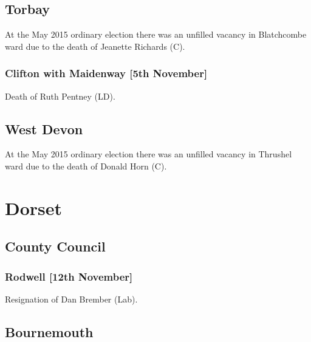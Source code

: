 \documentclass[a4paper,openany]{book}
\begin{document}
\begin{resultsiii}
\subsection*{Torbay}

At the May 2015 ordinary election there was an unfilled vacancy in Blatchcombe ward due to the death of Jeanette Richards (C).

\subsubsection*{Clifton with Maidenway \hspace*{\fill}\nolinebreak[1]%
\enspace\hspace*{\fill}
[5th November]}


Death of Ruth Pentney (LD).

\subsection*{West Devon}

At the May 2015 ordinary election there was an unfilled vacancy in Thrushel ward due to the death of Donald Horn (C).

\section{Dorset}

\subsection*{County Council}

\subsubsection*{Rodwell \hspace*{\fill}\nolinebreak[1]%
\enspace\hspace*{\fill}
[12th November]}


Resignation of Dan Brember (Lab).

\subsection*{Bournemouth}


\end{resultsiii}
\end{document}
